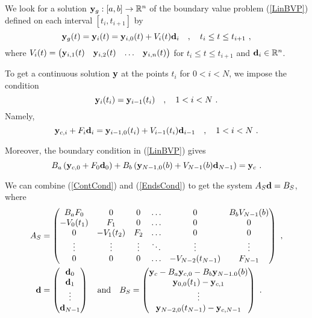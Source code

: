 We look for a solution $\mathbf{y}_g:[a,b]\to \mathbb{R}^n$ of the boundary
value problem (\ref{LinBVP}) defined on each interval $[t_i,t_{i+1}]$ by
\[
\mathbf{y}_g(t) = \mathbf{y}_i(t) = \mathbf{y}_{i,0}(t) + V_i(t) \mathbf{d}_i
\quad , \quad t_i \leq t \leq t_{i+1} \ ,
\]
where $\displaystyle V_i(t) =
\begin{pmatrix}
\mathbf{y}_{i,1}(t) & \mathbf{y}_{i,2}(t) & \ldots & \mathbf{y}_{i,n}(t)  
\end{pmatrix}$ for $t_i \leq t \leq t_{i+1}$ and $\mathbf{d}_i \in \mathbb{R}^n$.

To get a continuous solution $\mathbf{y}$ at the points $t_i$ for
$0 < i < N$, we impose the condition
\[
\mathbf{y}_i(t_i) = \mathbf{y}_{i-1}(t_i) \quad , \quad 1 < i < N \ .
\]
Namely,
\begin{equation} \label{ContCond}
\mathbf{y}_{c,i} + F_i\mathbf{d}_i = \mathbf{y}_{i-1,0}(t_i) +
V_{i-1}(t_i)\mathbf{d}_{i-1} \quad , \quad 1 < i < N \ .
\end{equation}

Moreover, the boundary condition in (\ref{LinBVP}) gives
\begin{equation} \label{EndsCond}
B_a \left( \VEC{y}_{c,0} + F_0\VEC{d}_0 \right) + B_b \left(
\VEC{y}_{N-1,0}(b) + V_{N-1}(b)\VEC{d}_{N-1} \right) = \VEC{y}_c \ .
\end{equation}

We can combine (\ref{ContCond}) and (\ref{EndsCond}) to get the system
$A_S \mathbf{d} = B_S$, where
\begin{align}
A_S &= \begin{pmatrix}
B_a F_0 & 0 & 0 & \ldots & 0 & B_b V_{N-1}(b)\\
-V_0(t_1) & F_1 & 0 & \ldots & 0 & 0 \\
0 & -V_1(t_2) & F_2 & \ldots & 0 & 0 \\
\vdots & \vdots & \vdots & \ddots & \vdots & \vdots \\
0 & 0 & 0 & \ldots & -V_{N-2}(t_{N-1}) & F_{N-1}
\end{pmatrix}
\ ,  \label{MFPSBVPa} \\
\mathbf{d} &= \begin{pmatrix} \mathbf{d}_0 \\ \mathbf{d}_1 \\ \vdots \\
\mathbf{d}_{N-1} \end{pmatrix}
\quad \text{and} \quad
B_S = \begin{pmatrix}
\mathbf{y}_c - B_a \mathbf{y}_{c,0} -B_b\mathbf{y}_{N-1.0}(b) \\
\mathbf{y}_{0,0}(t_1) - \mathbf{y}_{c,1} \\
\vdots \\
\mathbf{y}_{N-2,0}(t_{N-1}) - \mathbf{y}_{c,N-1}
\end{pmatrix} \ . \label{MFPSBVPb}
\end{align}

